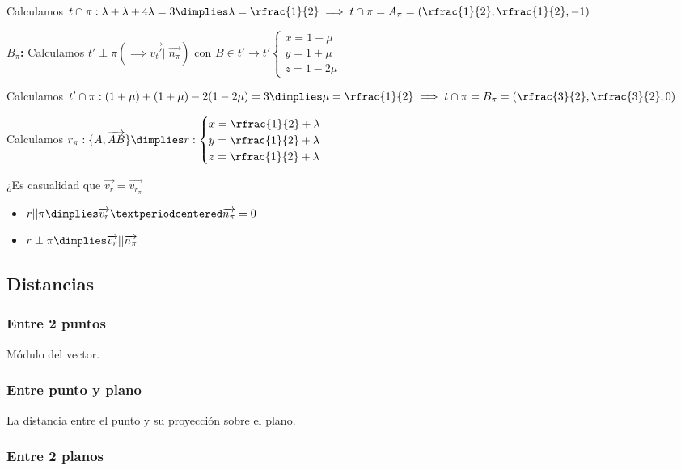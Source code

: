 \begin{problem}
\begin{enumerate}
  Calculamos $t\cap\pi: \lambda+\lambda+4\lambda=3\dimplies \lambda=\rfrac{1}{2} \implies t\cap\pi =A_{\pi}=\left(\rfrac{1}{2},\rfrac{1}{2},-1\right)$

  \textbf{$B_{\pi}$:} Calculamos $t'\perp\pi (\implies \vec{v_t'}||\vec{n_{\pi}})$ con $B\in t'\to t'\begin{cases}x=1+\mu\\y=1+\mu\\z=1-2\mu\end{cases}$

  Calculamos $t'\cap\pi: (1+\mu)+(1+\mu)-2(1-2\mu)=3\dimplies \mu=\rfrac{1}{2} \implies t\cap\pi =B_{\pi}=\left(\rfrac{3}{2},\rfrac{3}{2},0\right)$

  Calculamos $r_{\pi}:\{A,\vec{AB}\} \dimplies r:\begin{cases}x=\rfrac{1}{2}+\lambda\\y=\rfrac{1}{2}+\lambda\\z=\rfrac{1}{2}+\lambda\end{cases}$

\obs ¿Es casualidad que $\vec{v_r} = \vec{v_{r_{\pi}}}$

\end{enumerate}

\end{problem}


\begin{itemize}
  \item $r || \pi \dimplies \vec{v_r}·\vec{n_{\pi}} = 0$
  \item $r\perp \pi \dimplies \vec{v_r}||\vec{n_{\pi}}$
\end{itemize}

\subsection{Distancias}
\subsubsection{Entre 2 puntos}
Módulo del vector.

\subsubsection{Entre punto y plano}
La distancia entre el punto y su proyección sobre el plano.

\subsubsection{Entre 2 planos}

